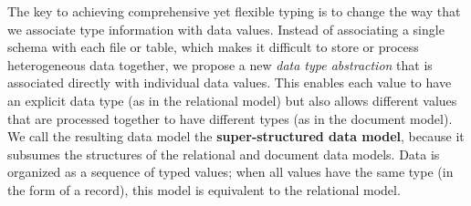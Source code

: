 

The key to achieving comprehensive yet flexible typing is to change the way that we associate type information with data values. Instead of associating a single schema with each file or table, which makes it difficult to store or process heterogeneous data together, we propose a new {\em data type abstraction} that is associated directly with individual data values. This enables each value to have an explicit data type (as in the relational model) but also allows different values that are processed together to have different types (as in the document model). We call the resulting data model the {\bf super-structured data model}, because it subsumes the structures of the relational and document data models. Data is organized as a sequence of typed values; when all values have the same type (in the form of a record), this model is equivalent to the relational model.

